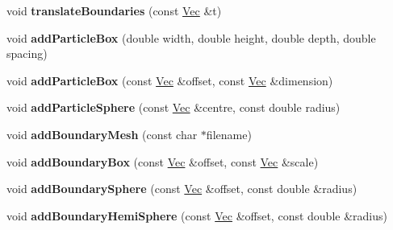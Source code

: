 \begin{DoxyCompactItemize}
\item 
\hypertarget{classhokusai_1_1System_a0a3d7e4e33895f50de7462265f9dbdc1}{void {\bfseries translate\+Boundaries} (const \hyperlink{classhokusai_1_1Vec3}{Vec} \&t)}\label{classhokusai_1_1System_a0a3d7e4e33895f50de7462265f9dbdc1}

\item 
\hypertarget{classhokusai_1_1System_afdf9d3e25f2577cf8ca0587020f4a915}{void {\bfseries add\+Particle\+Box} (double width, double height, double depth, double spacing)}\label{classhokusai_1_1System_afdf9d3e25f2577cf8ca0587020f4a915}

\item 
\hypertarget{classhokusai_1_1System_a6791b6a6a6404891d2081f70f3c7d65b}{void {\bfseries add\+Particle\+Box} (const \hyperlink{classhokusai_1_1Vec3}{Vec} \&offset, const \hyperlink{classhokusai_1_1Vec3}{Vec} \&dimension)}\label{classhokusai_1_1System_a6791b6a6a6404891d2081f70f3c7d65b}

\item 
\hypertarget{classhokusai_1_1System_a347bd0d11ca4848d5175707f08dcbbf4}{void {\bfseries add\+Particle\+Sphere} (const \hyperlink{classhokusai_1_1Vec3}{Vec} \&centre, const double radius)}\label{classhokusai_1_1System_a347bd0d11ca4848d5175707f08dcbbf4}

\item 
\hypertarget{classhokusai_1_1System_a1690431cc65e14a334509893fe463aa3}{void {\bfseries add\+Boundary\+Mesh} (const char $\ast$filename)}\label{classhokusai_1_1System_a1690431cc65e14a334509893fe463aa3}

\item 
\hypertarget{classhokusai_1_1System_a77e48404cd67489b7c015ee141e0da69}{void {\bfseries add\+Boundary\+Box} (const \hyperlink{classhokusai_1_1Vec3}{Vec} \&offset, const \hyperlink{classhokusai_1_1Vec3}{Vec} \&scale)}\label{classhokusai_1_1System_a77e48404cd67489b7c015ee141e0da69}

\item 
\hypertarget{classhokusai_1_1System_a1c035dcf309d5509023f7fd6aa0cb502}{void {\bfseries add\+Boundary\+Sphere} (const \hyperlink{classhokusai_1_1Vec3}{Vec} \&offset, const double \&radius)}\label{classhokusai_1_1System_a1c035dcf309d5509023f7fd6aa0cb502}

\item 
\hypertarget{classhokusai_1_1System_a626e71abfa7bd63f6cd9c8310bc3eff7}{void {\bfseries add\+Boundary\+Hemi\+Sphere} (const \hyperlink{classhokusai_1_1Vec3}{Vec} \&offset, const double \&radius)}\label{classhokusai_1_1System_a626e71abfa7bd63f6cd9c8310bc3eff7}


\end{DoxyCompactItemize}
